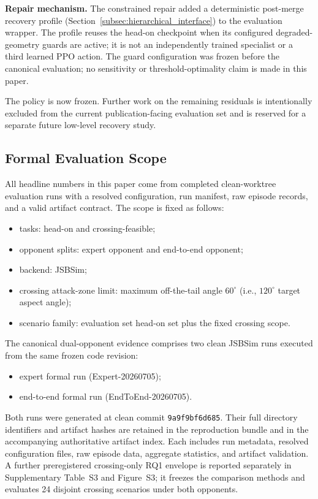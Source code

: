 \documentclass[5p,times]{elsarticle} %
\begin{document}
\textbf{Repair mechanism.} The constrained repair added a deterministic post-merge recovery profile (Section~\ref{subsec:hierarchical_interface}) to the evaluation wrapper. The profile reuses the head-on checkpoint when its configured degraded-geometry guards are active; it is not an independently trained specialist or a third learned PPO action. The guard configuration was frozen before the canonical evaluation; no sensitivity or threshold-optimality claim is made in this paper.

The policy is now frozen. Further work on the remaining residuals is intentionally excluded from the current publication-facing evaluation set and is reserved for a separate future low-level recovery study.

\subsection{Formal Evaluation Scope}

All headline numbers in this paper come from completed clean-worktree evaluation runs with a resolved configuration, run manifest, raw episode records, and a valid artifact contract. The scope is fixed as follows:
\begin{itemize}
    \item tasks: head-on and crossing-feasible;
    \item opponent splits: expert opponent and end-to-end opponent;
    \item backend: JSBSim;
    \item crossing attack-zone limit: maximum off-the-tail angle $60^\circ$ (i.e., $120^\circ$ target aspect angle);
    \item scenario family: evaluation set head-on set plus the fixed crossing scope.
\end{itemize}

The canonical dual-opponent evidence comprises two clean JSBSim runs executed from the same frozen code revision:
\begin{itemize}
    \item expert formal run (Expert-20260705);
    \item end-to-end formal run (EndToEnd-20260705).
\end{itemize}
Both runs were generated at clean commit \texttt{9a9f9bf6d685}. Their full directory identifiers and artifact hashes are retained in the reproduction bundle and in the accompanying authoritative artifact index. Each includes run metadata, resolved configuration files, raw episode data, aggregate statistics, and artifact validation. A further preregistered crossing-only RQ1 envelope is reported separately in Supplementary Table~S3 and Figure~S3; it freezes the comparison methods and evaluates 24 disjoint crossing scenarios under both opponents.
\end{document}
